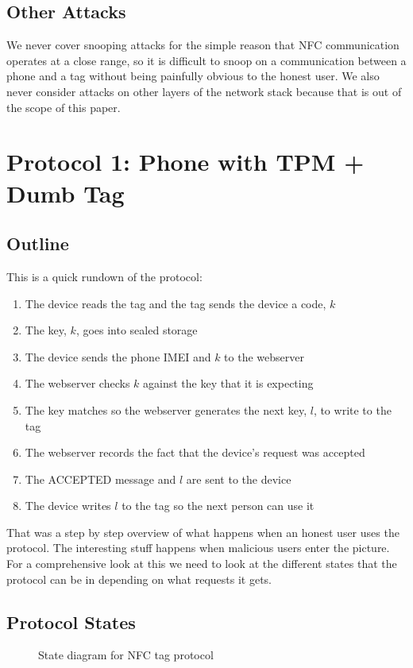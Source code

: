 \documentclass{sig-alternate}
\begin{document}
\subsection{Other Attacks}
We never cover snooping attacks for the simple reason that NFC
communication operates at a close range, so it is difficult to snoop
on a communication between a phone and a tag without being painfully
obvious to the honest user. We also never consider attacks on other
layers of the network stack because that is out of the scope of this
paper.

\section{Protocol 1: Phone with TPM + Dumb Tag}

\subsection{Outline}
This is a quick rundown of the protocol:

\begin{enumerate}
\item The device reads the tag and the tag sends the device a code, $k$
\item The key, $k$, goes into sealed storage
\item The device sends the phone IMEI and $k$ to the webserver
\item The webserver checks $k$ against the key that it is expecting
\item The key matches so the webserver generates the next key, $l$, to write to the tag
\item The webserver records the fact that the device's request was accepted
\item The ACCEPTED message and $l$ are sent to the device 
\item The device writes $l$ to the tag so the next person can use it
\end{enumerate}

That was a step by step overview of what happens when an honest user
uses the protocol. The interesting stuff happens when malicious users
enter the picture. For a comprehensive look at this we need to look at
the different states that the protocol can be in depending on what
requests it gets.

\subsection{Protocol States}
\begin{figure}
\centering
{}
\caption{State diagram for NFC tag protocol}
\end{figure}
\end{document}
